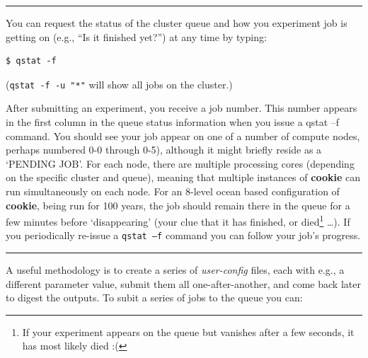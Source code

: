 \vspace{1mm}\noindent\rule{4cm}{0.1mm}\vspace{2mm}

\noindent You can request the status of the cluster queue and how you experiment job is getting on (e.g., “Is it finished yet?”) at any time by typing:
\vspace{-1mm}\small\begin{verbatim}
$ qstat -f
\end{verbatim}\normalsize\vspace{-1mm}
(\texttt{qstat -f -u "*"} will show all jobs on the cluster.)

\vspace{1mm}
After submitting an experiment, you receive a job number. This number appears in the first column in the queue status information when you issue a qstat –f command. You should see your job appear on one of a number of compute nodes, perhaps numbered 0-0 through 0-5), although it might briefly reside as a ‘\textsf{\footnotesize PENDING JOB}’. For each node, there are multiple processing cores (depending on the specific cluster and queue), meaning that multiple instances of \textbf{cookie} can run simultaneously on each node. For an 8-level ocean based configuration of \textbf{cookie}, being run for 100 years, the job should remain there in the queue for a few minutes before ‘disappearing’ (your clue that it has finished, or died\footnote{If your experiment appears on the queue but vanishes after a few seconds, it has most likely died :(} …). If you periodically re-issue a \texttt{qstat –f} command you can follow your job’s progress.

\vspace{1mm}\noindent\rule{4cm}{0.1mm}\vspace{2mm}

\newpage

\noindent A useful methodology is to create a series of \textit{user-config} files, each with e.g., a different parameter value, submit them all one-after-another, and come back later to digest the outputs. To subit a series of jobs to the queue you can:

